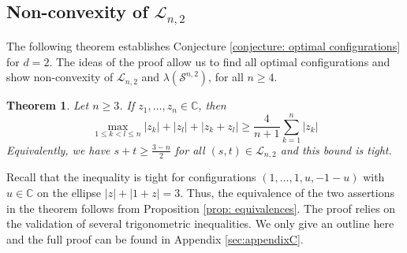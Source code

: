 \documentclass[reqno,hidelinks,11pt]{amsart}
\numberwithin{equation}{section}
\newtheorem{theorem}{Theorem}[section]
\def\CC{\mathbb{C}}
\begin{document}
\subsection{Non-convexity of \texorpdfstring{$\mathcal{L}_{n,2}$}{Ln2}}

The following theorem establishes Conjecture \ref{conjecture: optimal configurations} for $d=2$. The ideas of the proof allow us to find all optimal configurations and show non-convexity of $\mathcal{L}_{n,2}$ and $\lambda(\mathcal{S}^{n,2})$, for all $n\ge4$.

\begin{theorem}\label{theorem: minmax d=2}
Let $n \geq 3$. If $z_1,\dots,z_n\in\CC$,  then
    \[
        \max_{1\le k<l\le n}|z_k|+|z_l|+|z_k+z_l|\ge\frac4{n+1}\sum_{k=1}^n|z_k|
    \]
Equivalently, we have $s+t \geq \frac{3-n}{2}$ for all $(s,t) \in \mathcal{L}_{n,2}$ and this bound is tight.
\end{theorem}
Recall that the inequality is tight for configurations $(1,\ldots,1,u,-1-u)$ with $u \in \CC$ on the ellipse $|z|+|1+z|=3$. Thus, the equivalence of the two assertions in the theorem follows from Proposition \ref{prop: equivalences}. The proof relies on the validation of several trigonometric inequalities. We only give an outline here and the full proof can be found in Appendix \ref{sec:appendixC}. 
\end{document}
